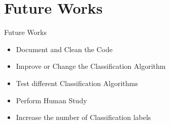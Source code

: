 \section{Future Works}
\begin{frame}{Future Works}
\begin{itemize}
    \item Document and Clean the Code
    \item Improve or Change the Classification Algorithm
    \item Test different Classification Algorithms
    \item Perform Human Study
    \item Increase the number of Classification labels
\end{itemize}
\end{frame}